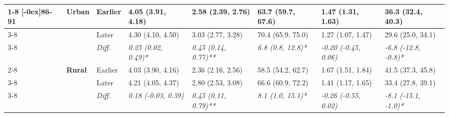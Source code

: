 \documentclass[12pt, a4paper]{article}
\begin{document}
\begin{appendices}
\begin{table}[!p]
{\begin{tabular}[t]{>{}l>{}lllllll}
        \cmidrule{1-8}
        \multirow{9}{*}[-0ex]{\textbf{86-91}} & \multirow{3}{*}{\textbf{Urban}} & Earlier                       & 4.05 (3.91, 4.18)                           & 2.58 (2.39, 2.76)                            & 63.7 (59.7, 67.6)                           & 1.47 (1.31, 1.63)                              & 36.3 (32.4, 40.3)                              \\
        \cmidrule{3-8}
                                              &                                 & Later                         & 4.30 (4.10, 4.50)                           & 3.03 (2.77, 3.28)                            & 70.4 (65.9, 75.0)                           & 1.27 (1.07, 1.47)                              & 29.6 (25.0, 34.1)                              \\
        \cmidrule{3-8}
                                              &                                 & \cellcolor{gray!10}\em{Diff.} & \cellcolor{gray!10}\em{0.25 (0.02, 0.49)*}  & \cellcolor{gray!10}\em{0.45 (0.14, 0.77)**}  & \cellcolor{gray!10}\em{6.8 (0.8, 12.8)*}    & \cellcolor{gray!10}\em{-0.20 (-0.45, 0.06)}    & \cellcolor{gray!10}\em{-6.8 (-12.8, -0.8)*}    \\
        \cmidrule{2-8}
                                              & \multirow{3}{*}{\textbf{Rural}} & Earlier                       & 4.03 (3.90, 4.16)                           & 2.36 (2.16, 2.56)                            & 58.5 (54.2, 62.7)                           & 1.67 (1.51, 1.84)                              & 41.5 (37.3, 45.8)                              \\
        \cmidrule{3-8}
                                              &                                 & Later                         & 4.21 (4.05, 4.37)                           & 2.80 (2.53, 3.08)                            & 66.6 (60.9, 72.2)                           & 1.41 (1.17, 1.65)                              & 33.4 (27.8, 39.1)                              \\
        \cmidrule{3-8}
                                              &                                 & \cellcolor{gray!10}\em{Diff.} & \cellcolor{gray!10}\em{0.18 (-0.03, 0.39)}  & \cellcolor{gray!10}\em{0.45 (0.11, 0.79)**}  & \cellcolor{gray!10}\em{8.1 (1.0, 15.1)*}    & \cellcolor{gray!10}\em{-0.26 (-0.55, 0.02)}    & \cellcolor{gray!10}\em{-8.1 (-15.1, -1.0)*}    \\
        \bottomrule
      \end{tabular}}
  \end{table}
  \vspace*{\fill}

\end{appendices}
\end{document}
